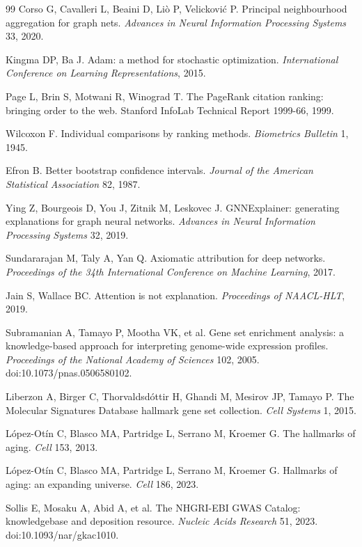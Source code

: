 \documentclass[11pt]{article}
\begin{document}
\begin{thebibliography}{99}
 Corso G, Cavalleri L, Beaini D, Li\`{o} P, Velickovi\'{c} P. Principal neighbourhood aggregation for graph nets. \textit{Advances in Neural Information Processing Systems} 33, 2020.

 Kingma DP, Ba J. Adam: a method for stochastic optimization. \textit{International Conference on Learning Representations}, 2015.

 Page L, Brin S, Motwani R, Winograd T. The PageRank citation ranking: bringing order to the web. Stanford InfoLab Technical Report 1999-66, 1999.

 Wilcoxon F. Individual comparisons by ranking methods. \textit{Biometrics Bulletin} 1, 1945.

 Efron B. Better bootstrap confidence intervals. \textit{Journal of the American Statistical Association} 82, 1987.

 Ying Z, Bourgeois D, You J, Zitnik M, Leskovec J. GNNExplainer: generating explanations for graph neural networks. \textit{Advances in Neural Information Processing Systems} 32, 2019.

 Sundararajan M, Taly A, Yan Q. Axiomatic attribution for deep networks. \textit{Proceedings of the 34th International Conference on Machine Learning}, 2017.

 Jain S, Wallace BC. Attention is not explanation. \textit{Proceedings of NAACL-HLT}, 2019.

 Subramanian A, Tamayo P, Mootha VK, et al. Gene set enrichment analysis: a knowledge-based approach for interpreting genome-wide expression profiles. \textit{Proceedings of the National Academy of Sciences} 102, 2005. doi:10.1073/pnas.0506580102.

 Liberzon A, Birger C, Thorvaldsd\'{o}ttir H, Ghandi M, Mesirov JP, Tamayo P. The Molecular Signatures Database hallmark gene set collection. \textit{Cell Systems} 1, 2015.

 L\'{o}pez-Ot\'{i}n C, Blasco MA, Partridge L, Serrano M, Kroemer G. The hallmarks of aging. \textit{Cell} 153, 2013.

 L\'{o}pez-Ot\'{i}n C, Blasco MA, Partridge L, Serrano M, Kroemer G. Hallmarks of aging: an expanding universe. \textit{Cell} 186, 2023.

 Sollis E, Mosaku A, Abid A, et al. The NHGRI-EBI GWAS Catalog: knowledgebase and deposition resource. \textit{Nucleic Acids Research} 51, 2023. doi:10.1093/nar/gkac1010.


\end{thebibliography}
\end{document}
